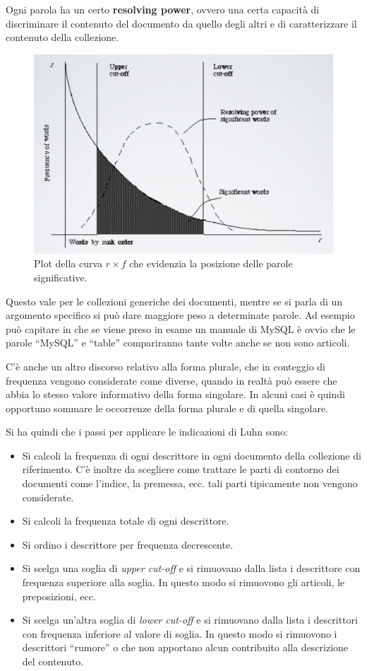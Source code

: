 Ogni parola ha un certo \textbf{resolving power}, ovvero una certa capacità di discriminare il contenuto del documento da quello degli altri e di caratterizzare il contenuto della collezione.

\begin{figure}[htbp]
	\centering
	\includegraphics[width=0.55\linewidth]{images/l3-cutoff}
	\caption{Plot della curva $r \times f$ che evidenzia la posizione delle parole significative.}
\end{figure}

Questo vale per le collezioni generiche dei documenti, mentre se si parla di un argomento specifico si può dare maggiore peso a determinate parole. Ad esempio può capitare in che se viene preso in esame un manuale di MySQL è ovvio che le parole ``MySQL'' e  ``table'' compariranno tante volte anche se non sono articoli.

C'è anche un altro discorso relativo alla forma plurale, che in conteggio di frequenza vengono considerate come diverse, quando in realtà può essere che abbia lo stesso valore informativo della forma singolare. In alcuni casi è quindi opportuno sommare le occorrenze della forma plurale e di quella singolare.

Si ha quindi che i passi per applicare le indicazioni di Luhn sono:

\begin{itemize}
	\item Si calcoli la frequenza di ogni descrittore in ogni documento della collezione di riferimento. C'è inoltre da scegliere come trattare le parti di contorno dei documenti come l'indice, la premessa, ecc. tali parti tipicamente non vengono considerate.
	\item Si calcoli la frequenza totale di ogni descrittore.
	\item Si ordino i descrittore per frequenza decrescente.
	\item Si scelga una soglia di \textit{upper cut-off} e si rimuovano dalla lista i descrittore con frequenza superiore alla soglia. In questo modo si rimuovono gli articoli, le preposizioni, ecc.
	\item Si scelga un'altra soglia di \textit{lower cut-off} e si rimuovano dalla lista i descrittori con frequenza inferiore al valore di soglia. In questo modo si rimuovono i descrittori ``rumore''  o che non apportano alcun contribuito alla descrizione del contenuto.
\end{itemize}

